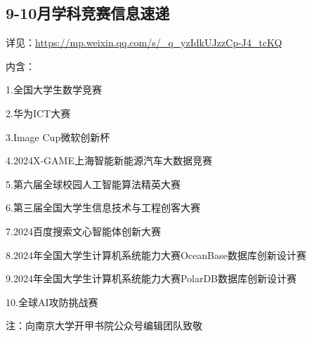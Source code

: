 \documentclass[letterpaper, 12pt]{article}
\begin{document}
\begin{multicols}{2}
\section{9-10月学科竞赛信息速递}
详见：\url{https://mp.weixin.qq.com/s/_q_yzIdkUJzzCp-J4_tcKQ}

内含：

1.全国大学生数学竞赛

2.华为ICT大赛

3.Image Cup微软创新杯

4.2024X-GAME上海智能新能源汽车大数据竞赛

5.第六届全球校园人工智能算法精英大赛

6.第三届全国大学生信息技术与工程创客大赛

7.2024百度搜索文心智能体创新大赛

8.2024年全国大学生计算机系统能力大赛OceanBase数据库创新设计赛

9.2024年全国大学生计算机系统能力大赛PolarDB数据库创新设计赛

10.全球AI攻防挑战赛

注：向南京大学开甲书院公众号编辑团队致敬
\end{multicols} 
\end{document}
